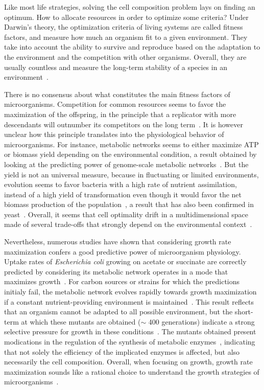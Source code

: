 Like most life strategies, solving the cell composition problem lays on finding an optimum.
How to allocate resources in order to optimize some criteria?
Under Darwin's theory, the optimization criteria of living systems are called fitness factors, and measure how much an organism fit to a given environment.
They take into account the ability to survive and reproduce based on the adaptation to the environment and the competition with other organisms.
Overall, they are usually countless and measure the long-term stability of a species in an environment~\cite{dawkins_selfish_1976}.

There is no consensus about what constitutes the main fitness factors of microorganisms.
Competition for common resources seems to favor the maximization of the offspring, in the principle that a replicator with more descendants will outnumber its competitors on the long term~\cite{dawkins_selfish_1976}.
It is however unclear how this principle translates into the physiological behavior of microorganisms.
For instance, metabolic networks seems to either maximize ATP or biomass yield depending on the environmental condition, a result obtained by looking at the predicting power of genome-scale metabolic networks~\cite{schuetz_systematic_2007}.
But the yield is not an universal measure, because in fluctuating or limited environments, evolution seems to favor bacteria with a high rate of nutrient assimilation, instead of a high yield of transformation even though it would favor the net biomass production of the population~\cite{frank_tradeoff_2010,maclean_tragedy_2008}, a result that has also been confirmed in yeast~\cite{schuster_maximization_2008}.
Overall, it seems that cell optimality drift in a multidimensional space made of several trade-offs that strongly depend on the environmental context~\cite{schuetz_multidimensional_2012}.

Nevertheless, numerous studies have shown that considering growth rate maximization confers a good predictive power of microorganism physiology.
Uptake rates of \textit{Escherichia coli} growing on acetate or succinate are correctly predicted by considering its metabolic network operates in a mode that maximizes growth~\cite{edwards_silico_2001}.
For carbon sources or strains for which the predictions initialy fail, the metabolic network evolves rapidly towards growth maximization if a constant nutrient-providing environment is maintained~\cite{ibarra_escherichia_2002}.
This result reflects that an organism cannot be adapted to all possible environment, but the short-term at which these mutants are obtained ($\sim$ 400 generations) indicate a strong selective pressure for growth in these conditions~\cite{molenaar_shifts_2009}.
The mutants obtained present modications in the regulation of the synthesis of metabolic enzymes~\cite{lewis_omic_2010}, indicating that not solely the efficiency of the implicated enzymes is affected, but also necessarily the cell composition.
Overall, when focusing on growth, growth rate maximization sounds like a rational choice to understand the growth strategies of microorganisms~\cite{molenaar_shifts_2009}.

